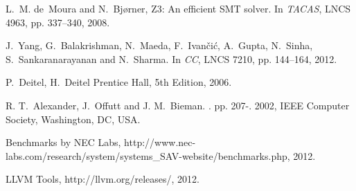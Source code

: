 \documentclass[a4paper]{llncs}
\begin{document}
{\begin{thebibliography}{10}
L.~M. de~Moura and N.~Bj{\o}rner, Z3: An efficient {SMT} solver.
\newblock In {\em  TACAS}, LNCS 4963, pp. 337--340, 2008.

J.~Yang, G.~Balakrishman, N.~Maeda, F.~Ivan\v{c}i\'c, A.~Gupta, N.~Sinha, S.~Sankaranarayanan and N.~Sharma.
\newblock In {\em CC}, LNCS 7210, pp. 144--164, 2012.

P.~Deitel, H.~Deitel
\newblock Prentice Hall, 5th Edition, 2006.

R. T.~Alexander, J.~Offutt and J. M.~Bieman. .
 pp. 207-. 2002,
IEEE Computer Society, Washington, DC, USA.

Benchmarks by NEC Labs, http://www.nec-labs.com/research/system/systems\_SAV-website/benchmarks.php, 2012.

LLVM Tools, http://llvm.org/releases/, 2012.

%


\end{thebibliography}}
\end{document}
